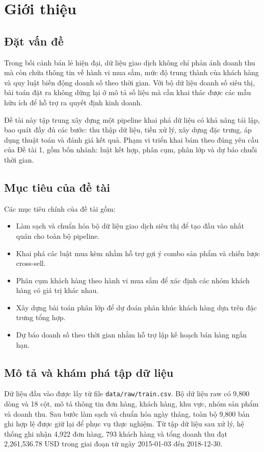 \chapter{Giới thiệu}\label{chapter_intro}

\section{Đặt vấn đề}

Trong bối cảnh bán lẻ hiện đại, dữ liệu giao dịch không chỉ phản ánh doanh thu mà còn chứa thông tin về hành vi mua sắm, mức độ trung thành của khách hàng và quy luật biến động doanh số theo thời gian. Với bộ dữ liệu doanh số siêu thị, bài toán đặt ra không dừng lại ở mô tả số liệu mà cần khai thác được các mẫu hữu ích để hỗ trợ ra quyết định kinh doanh.

Đề tài này tập trung xây dựng một pipeline khai phá dữ liệu có khả năng tái lập, bao quát đầy đủ các bước: thu thập dữ liệu, tiền xử lý, xây dựng đặc trưng, áp dụng thuật toán và đánh giá kết quả. Phạm vi triển khai bám theo đúng yêu cầu của Đề tài 1, gồm bốn nhánh: luật kết hợp, phân cụm, phân lớp và dự báo chuỗi thời gian.

\section{Mục tiêu của đề tài}

Các mục tiêu chính của đề tài gồm:
\begin{itemize}
\item Làm sạch và chuẩn hóa bộ dữ liệu giao dịch siêu thị để tạo đầu vào nhất quán cho toàn bộ pipeline.
\item Khai phá các luật mua kèm nhằm hỗ trợ gợi ý combo sản phẩm và chiến lược cross-sell.
\item Phân cụm khách hàng theo hành vi mua sắm để xác định các nhóm khách hàng có giá trị khác nhau.
\item Xây dựng bài toán phân lớp để dự đoán phân khúc khách hàng dựa trên đặc trưng tổng hợp.
\item Dự báo doanh số theo thời gian nhằm hỗ trợ lập kế hoạch bán hàng ngắn hạn.
\end{itemize}

\section{Mô tả và khám phá tập dữ liệu}

Dữ liệu đầu vào được lấy từ file \texttt{data/raw/train.csv}. Bộ dữ liệu raw có 9{,}800 dòng và 18 cột, mô tả thông tin đơn hàng, khách hàng, khu vực, nhóm sản phẩm và doanh thu. Sau bước làm sạch và chuẩn hóa ngày tháng, toàn bộ 9{,}800 bản ghi hợp lệ được giữ lại để phục vụ thực nghiệm. Từ tập dữ liệu sau xử lý, hệ thống ghi nhận 4{,}922 đơn hàng, 793 khách hàng và tổng doanh thu đạt 2{,}261{,}536.78 USD trong giai đoạn từ ngày 2015-01-03 đến 2018-12-30.

